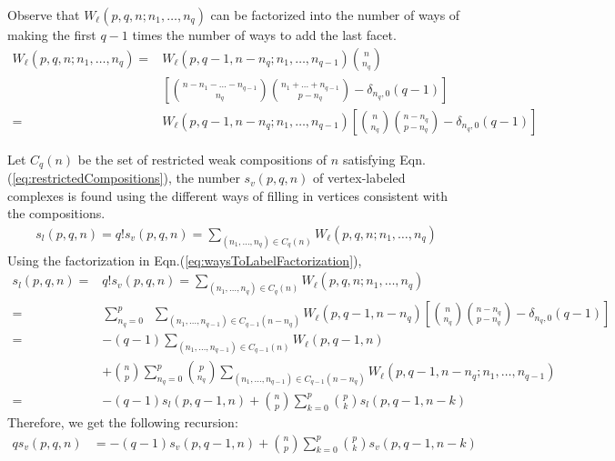 \documentclass[12pt]{article}
\theoremstyle{plain}
\theoremstyle{definition}
\theoremstyle{remark}
\newcommand{\CR}{\nonumber\\}
\begin{document}
Observe that $W_\ell(p,q,n;n_1,\dots,n_q)$ can be factorized into the number of ways of making the first $q-1$ times the number of ways to add the last facet. 
\begin{align}
\label{eq:waysToLabelFactorization}
    W_\ell(p,q,n;n_1,\dots,n_q)=&W_\ell(p,q-1,n-n_q;n_1,\dots,n_{q-1})\binom{n}{n_{q}}\CR
    &\left[\binom{n-n_1-\dots-n_{q-1}}{n_q}\binom{n_1+\dots+n_{q-1}}{p-n_q}-\delta_{n_q,0}(q-1)\right]\CR
    =&W_\ell(p,q-1,n-n_q;n_1,\dots,n_{q-1})\left[\binom{n}{n_q}\binom{n-n_{q}}{p-n_q}-\delta_{n_q,0}(q-1)\right]
\end{align}

Let ${C}_{q}(n)$ be the set of restricted weak compositions of $n$ satisfying Eqn.(\ref{eq:restrictedCompositions}), the number $s_v(p,q,n)$ of vertex-labeled complexes is found using the different ways of filling in vertices consistent with the compositions. 
\begin{align}
    \label{eq:vertexLabeledFromWaysToLabel}
    s_l(p,q,n)=q!s_v(p,q,n)=\sum_{(n_1,\dots,n_q)\in C_q(n)}W_\ell(p,q,n;n_1,\dots,n_q)
\end{align} 
Using the factorization in Eqn.(\ref{eq:waysToLabelFactorization}), 
\begin{align}
    s_l(p,q,n)=&q!s_v(p,q,n)=\sum_{(n_1,\dots,n_q)\in C_q(n)}W_\ell(p,q,n;n_1,\dots,n_q)\CR
    =&\sum_{n_q=0}^p\;\;\sum_{(n_1,\dots,n_{q-1})\in C_{q-1}(n-n_q)}W_\ell(p,q-1,n-n_q)\left[\binom{n}{n_q}\binom{n-n_{q}}{p-n_q}-\delta_{n_q,0}(q-1)\right]\CR
    =&-(q-1)\sum_{(n_1,\dots,n_{q-1})\in C_{q-1}(n)}W_\ell(p,q-1,n)\CR
    &+\binom{n}{p}\sum_{n_q=0}^p\binom{p}{n_q}\sum_{(n_1,\dots,n_{q-1})\in C_{q-1}(n-n_q)}W_\ell(p,q-1,n-n_q;n_1,\dots,n_{q-1})\CR
    =&-(q-1)s_l(p,q-1,n)+\binom{n}{p}\sum_{k=0}^p\binom{p}{k}s_l(p,q-1,n-k)
\end{align}
Therefore, we get the following recursion:
\begin{align}
    qs_v(p,q,n)&=-(q-1)s_v(p,q-1,n)+\binom{n}{p}\sum_{k=0}^p\binom{p}{k}s_v(p,q-1,n-k)
\end{align}
{\color{red}{\bf CONTINUE FROM HERE}}


\end{document}
